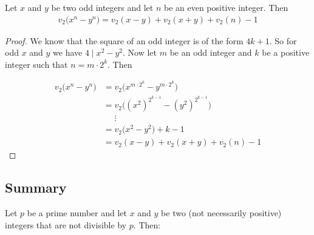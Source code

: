 \documentclass[main.tex]{subfile}
\begin{document}
    \begin{theorem}
        Let $x$ and $y$ be two odd integers and let $n$ be an even positive integer. Then
        \begin{align*}
        v_2\big(  x^n - y^n \big) = v_2(  x - y )+v_2(  x + y )+v_2(  n )-1
        \end{align*}
    \end{theorem}

    \begin{proof}
        We know that the square of an odd integer is of the form $4k+1.$ So for odd $x$ and $y$ we have $4 \mid x^2-y^2.$ Now let $m$ be an odd integer and $k$ be a positive integer such that $n=m \cdot 2^k.$ Then

            \begin{align*}
                v_2 \big( x^{n} - y^{n} \big)  & = v_2\big( x^{m \cdot 2^{k}} - y^{m \cdot 2^{k}} \big)   \\
                & = v_2\big((x^2)^{2^{k-1}}-(y^2)^{2^{k-1}}\big) \\
                & \phantom{=} \vdots \\
                & =  v_2 \big( x^{2} - y^{2} \big) + k-1  \\
                & = v_2 ( x - y )+v_2 ( x + y )+v_2 ( n )-1
            \end{align*}
    \end{proof}

\subsection{Summary}

    Let $p$ be a prime number and let $x$ and $y$ be two (not necessarily positive) integers that are not divisible by $p.$ Then:
\end{document}
